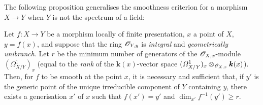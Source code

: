 The following proposition generalises the smoothness criterion  for a morphism $X\to Y$ when $Y$ is not the spectrum of a field:

\begin{proposition}[18.10.21]
\label{IV.18.10.21}
Let $f:X\to Y$ be a morphism locally of finite presentation, $x$ a point of $X$, $y=f(x)$, and suppose that the ring $\mathscr{O}_{Y,y}$ is \emph{integral} and \emph{geometrically unibranch}.
Let $r$ be the minimum number of generators of the $\mathscr{O}_{X,x}$-module $(\varOmega^1_{X/Y})_x$ \textup{(equal to the \emph{rank} of the $\boldsymbol{k}(x)$-vector space $(\varOmega^1_{X/Y})_x\otimes_{\mathscr{O}_{X,x}}\boldsymbol{k}(x)$)}.
Then, for $f$ to be smooth at the point $x$, it is necessary and sufficient that, if $y'$ is the generic point of the unique irreducible component of $Y$ containing $y$, there exists a generisation $x'$ of $x$ such that $f(x')=y'$ and $\dim_{x'}f^{-1}(y')\geq r$.
\end{proposition}

